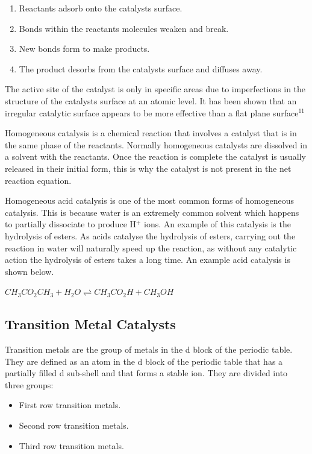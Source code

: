 \begin{enumerate}
\item Reactants adsorb onto the catalysts surface.
\item Bonds within the reactants molecules weaken and break.
\item New bonds form to make products.
\item The product desorbs from the catalysts surface and diffuses away.
\end{enumerate}

The active site of the catalyst is only in specific areas due to imperfections in the structure of the catalysts surface at an atomic level. It has been shown that an irregular catalytic surface appears to be more effective than a flat plane surface$^{11}$

Homogeneous catalysis is a chemical reaction that involves a catalyst that is in the same phase of the reactants. Normally homogeneous catalysts are dissolved in a solvent with the reactants. Once the reaction is complete the catalyst is usually released in their initial form, this is why the catalyst is not present in the net reaction equation.

Homogeneous acid catalysis is one of the most common forms of homogeneous catalysis. This is because water is an extremely common solvent which happens to partially dissociate to produce H$^+$ ions. An example of this catalysis is the hydrolysis of esters. As acids catalyse the hydrolysis of esters, carrying out the reaction in water will naturally speed up the reaction, as without any catalytic action the hydrolysis of esters takes a long time. An example acid catalysis is shown below.

$CH_3CO_2CH_3 + H_2O \rightleftharpoons CH_3CO_2H + CH_3OH$




	
	\subsection{Transition Metal Catalysts}

Transition metals are the group of metals in the d block of the periodic table. They are defined as an atom in the d block of the periodic table that has a partially filled d sub-shell and that forms a stable ion. They are divided into three groups:

\begin{itemize}
\item First row transition metals.
\item Second row transition metals.
\item Third row transition metals.
\end{itemize}

